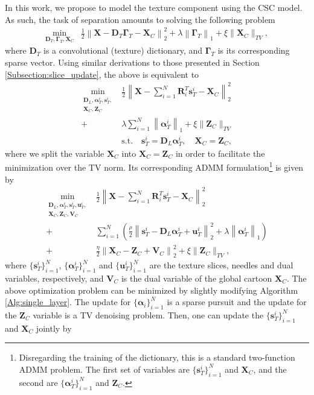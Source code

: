 \documentclass[10pt,twocolumn,letterpaper]{article}
\def\s{{\mathbf s}}
\def\X{{\mathbf X}}
\def\u{ \mathbf{u}}
\def\Z{{\mathbf Z}}
\def\u{{\mathbf u}}
\def\D{{\mathbf D}}
\def\R{{\mathbf R}}
\def\V{{\mathbf V}}
\def\alfa{{\boldsymbol \alpha}}
\def\Gama{{\boldsymbol \Gamma}}
\begin{document}
In this work, we propose to model the texture component using the CSC model. As such, the task of separation amounts to solving the following problem
\begin{align}
\min_{ { \D_T, \Gama_T, \X_C } } & \frac{1}{2} \left\| \X - \D_T \Gama_T - \X_C \right\|_2^2 + \lambda \left\| \Gama_T \right\|_1 + \xi \| \X_C \|_{TV},
\end{align}
where $\D_T$ is a convolutional (texture) dictionary, and $\Gama_T$ is its corresponding sparse vector. Using similar derivations to those presented in Section \ref{Subsection:slice_update}, the above is equivalent to
\begin{align}
\min_{ \substack{ \D_L, \alfa_T^i, \s_T^i, \\ \X_C, \Z_C } } & \frac{1}{2} \left\| \X - \sum_{i=1}^N \R_i^T \s_T^i - \X_C \right\|_2^2 \\
+ & \lambda \sum_{i=1}^N \left\| \alfa_T^i \right\|_1 + \xi \| \Z_C \|_{TV} \\
& \text{s.t.} \quad \s_T^i = \D_L \alfa_T^i, \quad \X_C = \Z_C,
\end{align}
where we split the variable $\X_C$ into $\X_C = \Z_C$ in order to facilitate the minimization over the TV norm. Its corresponding ADMM formulation\footnote{Disregarding the training of the dictionary, this is a standard two-function ADMM problem. The first set of variables are $\{ \s_T^i \}_{i=1}^N$ and $\X_C$, and the second are $\{ \alfa_T^i \}_{i=1}^N$ and $\Z_C$.} is given by
\begin{align}
\min_{ \substack{ \D_L, \alfa_T^i, \s_T^i, \u_T^i, \\ \X_C, \Z_C, \V_C } } & \frac{1}{2} \left\| \X - \sum_{i=1}^N \R_i^T \s_T^i - \X_C \right\|_2^2 \\
+ & \sum_{i=1}^N \left( \frac{\rho}{2} \left\| \s_T^i - \D_L \alfa_T^i + \u_T^i \right\|_2^2 + \lambda \left\| \alfa_T^i \right\|_1 \right) \\
+ & \frac{\eta}{2} \left\| \X_C - \Z_C + \V_C \right\|_2^2 + \xi \| \Z_C \|_{TV},
\end{align}
where $\{ \s_T^i \}_{i=1}^N$, $\{ \alfa_T^i \}_{i=1}^N$ and $\{ \u_T^i \}_{i=1}^N$ are the texture slices, needles and dual variables, respectively, and $\V_C$ is the dual variable of the global cartoon $\X_C$. The above optimization problem can be minimized by slightly modifying Algorithm \ref{Alg:single_layer}. The update for $\{ \alfa_i \}_{i=1}^N$ is a sparse pursuit and the update for the $\Z_C$ variable is a TV denoising problem. Then, one can update the $\{ \s_T^i \}_{i=1}^N$ and $\X_C$ jointly by
\end{document}
